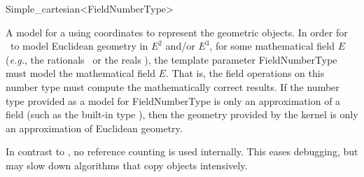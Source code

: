\begin{ccRefClass}{Simple_cartesian<FieldNumberType>}


\ccDefinition
A model for a  using  coordinates to represent the
geometric objects. In order for \ccRefName\ to model Euclidean geometry
in $E^2$ and/or $E^3$, for some mathematical field $E$ (\textit{e.g.},
the rationals \Q\ or the reals \R), the template parameter FieldNumberType      
must model the mathematical field $E$.  That is, the field operations on this
number type must compute the mathematically correct results.  If the number
type provided as a model for FieldNumberType is only an approximation of a
field (such as the built-in type ), then the geometry provided by
the kernel is only an approximation of Euclidean geometry.  


\ccIsModel
{}

\ccTypes
{}
\ccGlue
{}

\ccImplementation In contrast to , no reference counting
is used internally. This eases debugging, but may slow down algorithms
that copy objects intensively.

\ccSeeAlso
{} \\
 \\
 \\

\end{ccRefClass}
